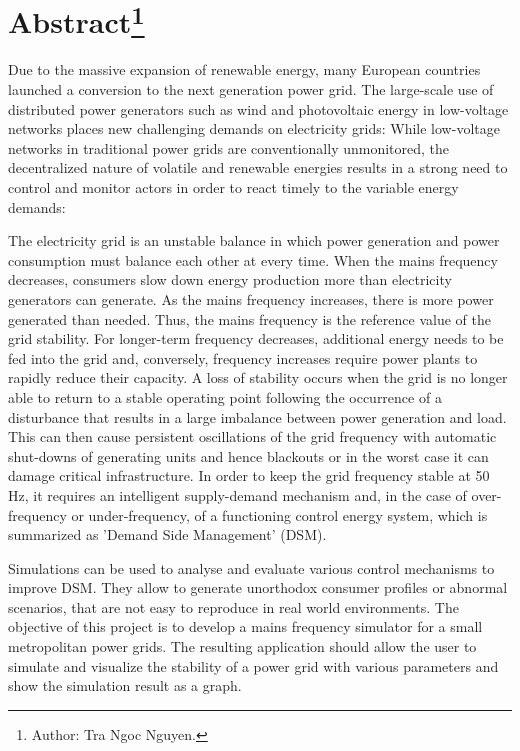 
\chapter*{Abstract\footnote{Author: Tra Ngoc Nguyen.}}

\noindent

    Due to the massive expansion of renewable energy, many European countries launched a conversion to the next generation power grid. The large-scale use of distributed power generators such as wind and photovoltaic energy in low-voltage networks places new challenging demands on electricity grids: While low-voltage networks in traditional power grids are conventionally unmonitored, the decentralized nature of volatile and renewable energies results in a strong need to control and monitor actors in order to react timely to the variable energy demands: \newline
    
    The electricity grid is an unstable balance in which power generation and power consumption must balance each other at every time. When the mains frequency decreases, consumers slow down energy production more than electricity generators can generate. As the mains frequency increases, there is more power generated than needed. Thus, the mains frequency is the reference value of the grid stability. For longer-term frequency decreases, additional energy needs to be fed into the grid and, conversely, frequency increases require power plants to rapidly reduce their capacity. A loss of stability occurs when the grid is no longer able to return to a stable operating point following the occurrence of a disturbance that results in a large imbalance between power generation and load. This can then cause persistent oscillations of the grid frequency with automatic shut-downs of generating units and hence blackouts or in the worst case it can damage critical infrastructure. In order to keep the grid frequency stable at 50 Hz, it requires an intelligent supply-demand mechanism and, in the case of over-frequency or under-frequency, of a functioning control energy system, which is summarized as 'Demand Side Management' (DSM). \newline
    
    Simulations can be used to analyse and evaluate various control mechanisms to improve DSM. They allow to generate unorthodox consumer profiles or abnormal scenarios, that are not easy to reproduce in real world environments. The objective of this project is to develop a mains frequency simulator for a small metropolitan power grids. The resulting application should allow the user to simulate and visualize the stability of a power grid with various parameters and show the simulation result as a graph.

